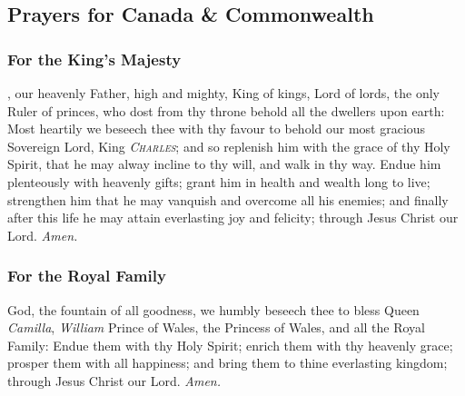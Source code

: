 
\clearpage
\subsection{Prayers for Canada \& Commonwealth}
\subsubsection{For the King's Majesty}
, our heavenly Father, high and mighty, King of kings, Lord of lords, the only Ruler of princes, who dost from thy throne behold all the dwellers upon earth: Most heartily we beseech thee with thy favour to behold our most gracious Sovereign Lord, King \textsc{\textit{Charles}}; and so replenish him with the grace of thy Holy Spirit, that he may alway incline to thy will, and walk in thy way. Endue him plenteously with heavenly gifts; grant him in health and wealth long to live; strengthen him that he may vanquish and overcome all his enemies; and finally after this life he may attain everlasting joy and felicity; through Jesus Christ our Lord. \textit{Amen.}

\subsubsection{For the Royal Family}
 God, the fountain of all goodness, we humbly beseech thee to bless Queen \textit{Camilla}, \textit{William} Prince of Wales, the Princess of Wales, and all the Royal Family: Endue them with thy Holy Spirit; enrich them with thy heavenly grace; prosper them with all happiness; and bring them to thine everlasting kingdom; through Jesus Christ our Lord. \textit{Amen.}

